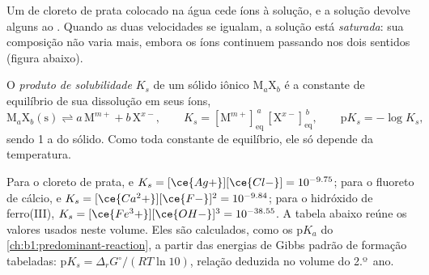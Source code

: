 Um  de cloreto de prata colocado na água cede íons à solução, e a
solução devolve alguns ao . Quando as duas velocidades se
igualam, a solução está \emph{saturada}: sua composição não varia mais,
embora os íons continuem passando nos dois sentidos (figura abaixo).

\begin{definition}\label{def:b1:precipitation:solubility-product}
O \emph{produto de solubilidade} $K_s$ de um
sólido iônico $\mathrm{M}_a\mathrm{X}_b$ é a constante de equilíbrio de
sua dissolução em seus íons,
\[
  \mathrm{M}_a\mathrm{X}_b\mathrm{(s)} \rightleftharpoons a\,\mathrm{M}^{m+}
  + b\,\mathrm{X}^{x-}, \qquad
  K_s = [\mathrm{M}^{m+}]_{\mathrm{eq}}^{\,a}\,[\mathrm{X}^{x-}]_{\mathrm{eq}}^{\,b},
  \qquad \mathrm{p}K_s = -\log K_s ,
\]
sendo 1 a  do sólido. Como toda constante de equilíbrio, ele só
depende da temperatura.
\end{definition}

Para o cloreto de prata,  e $K_s =
[\ce{Ag+}][\ce{Cl-}] = 10^{-9.75}$; para o fluoreto de cálcio,  e $K_s = [\ce{Ca^2+}][\ce{F-}]^2 = 10^{-9.84}$; para o
hidróxido de ferro(III), $K_s = [\ce{Fe^3+}][\ce{OH-}]^3 = 10^{-38.55}$.
A tabela abaixo reúne os valores usados neste volume.
Eles são calculados, como os $\mathrm{p}K_a$ do
\cref{ch:b1:predominant-reaction}, a partir das energias de Gibbs padrão
de formação tabeladas: $\mathrm{p}K_s = \Delta_r G^\circ/(RT\ln 10)$,
relação deduzida no volume do 2.º~ano.

